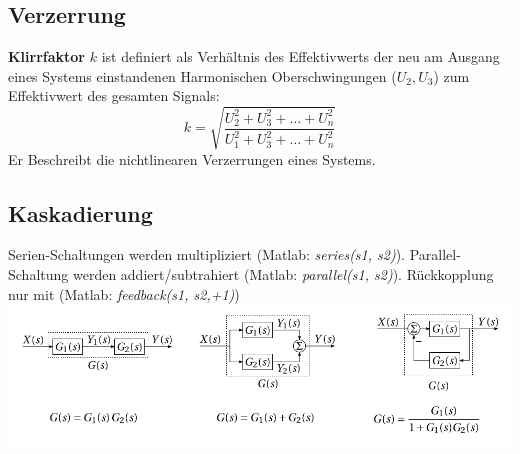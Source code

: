 \subsection{Verzerrung}
\textbf{Klirrfaktor} $k$ ist definiert als Verhältnis des Effektivwerts der neu am Ausgang eines Systems einstandenen Harmonischen Oberschwingungen ($U_2, U_3$) zum Effektivwert des gesamten Signals:
\[
k = \sqrt{\frac{U^2_2 + U^2_3 + \dots + U_n^2}{U^2_1 + U^2_3 + \dots + U_n^2}}
\]
Er Beschreibt die nichtlinearen Verzerrungen eines Systems.

\subsection{Kaskadierung}
Serien-Schaltungen werden multipliziert (Matlab: \textit{series(s1, s2)}). Parallel-Schaltung werden addiert/subtrahiert (Matlab: \textit{parallel(s1, s2)}). Rückkopplung nur mit (Matlab: \textit{feedback(s1, s2,+1)})
\includegraphics[width=\columnwidth]{Images/systeme}
